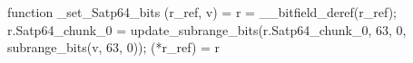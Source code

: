 function _set_Satp64_bits (r_ref, v) = {
    r = __bitfield_deref(r_ref);
    r.Satp64_chunk_0 = update_subrange_bits(r.Satp64_chunk_0, 63, 0, subrange_bits(v, 63, 0));
    (*r_ref) = r
}

